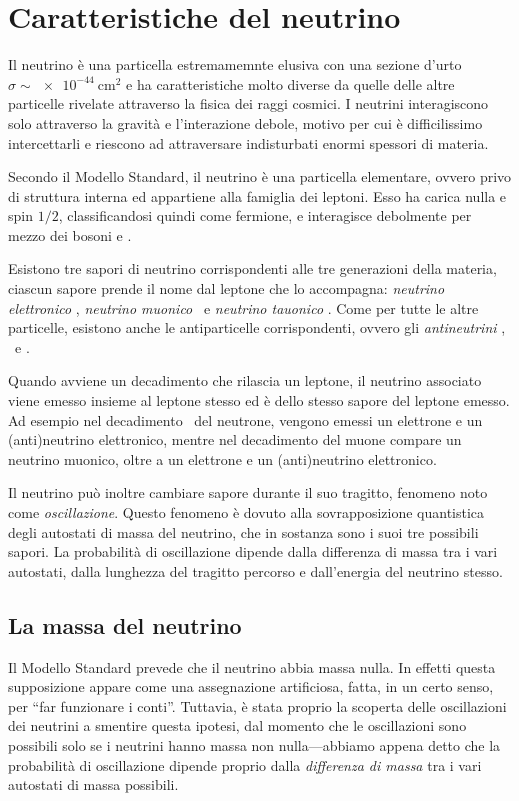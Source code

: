     \section{Caratteristiche del neutrino}
        Il neutrino è una particella estremamemnte elusiva con una sezione d'urto $\sigma \sim \SI{e-44}{\centi\meter\squared}$ e ha caratteristiche molto diverse da quelle delle altre particelle rivelate attraverso la fisica dei raggi cosmici. I neutrini interagiscono solo attraverso la gravità e l'interazione debole, motivo per cui è difficilissimo intercettarli e riescono ad attraversare indisturbati enormi spessori di materia.

        Secondo il Modello Standard, il neutrino è una particella elementare, ovvero privo di struttura interna ed appartiene alla famiglia dei leptoni. Esso ha carica nulla e spin $1/2$, classificandosi quindi come fermione, e interagisce debolmente per mezzo dei bosoni \Wpm e \Z.
        
        Esistono tre sapori di neutrino corrispondenti alle tre generazioni della materia, ciascun sapore prende il nome dal leptone che lo accompagna: \emph{neutrino elettronico} \neutrinoe, \emph{neutrino muonico} \neutrinomu\ e \emph{neutrino tauonico} \neutrinotau. Come per tutte le altre particelle, esistono anche le antiparticelle corrispondenti, ovvero gli \emph{antineutrini} \antineutrinoe, \antineutrinomu\ e \antineutrinotau.

        Quando avviene un decadimento che rilascia un leptone, il neutrino associato viene emesso insieme al leptone stesso ed è dello stesso sapore del leptone emesso. Ad esempio nel decadimento \betap\ del neutrone, vengono emessi un elettrone e un (anti)neutrino elettronico, mentre nel decadimento del muone compare un neutrino muonico, oltre a un elettrone e un (anti)neutrino elettronico.

        Il neutrino può inoltre cambiare sapore durante il suo tragitto, fenomeno noto come \emph{oscillazione}. Questo fenomeno è dovuto alla sovrapposizione quantistica degli autostati di massa del neutrino, che in sostanza sono i suoi tre possibili sapori. La probabilità di oscillazione dipende dalla differenza di massa tra i vari autostati, dalla lunghezza del tragitto percorso e dall'energia del neutrino stesso.

        \subsection{La massa del neutrino}
            Il Modello Standard prevede che il neutrino abbia massa nulla. In effetti questa supposizione appare come una assegnazione artificiosa, fatta, in un certo senso, per ``far funzionare i conti''. Tuttavia, è stata proprio la scoperta delle oscillazioni dei neutrini a smentire questa ipotesi, dal momento che le oscillazioni sono possibili solo se i neutrini hanno massa non nulla---abbiamo appena detto che la probabilità di oscillazione dipende proprio dalla \emph{differenza di massa} tra i vari autostati di massa possibili.

